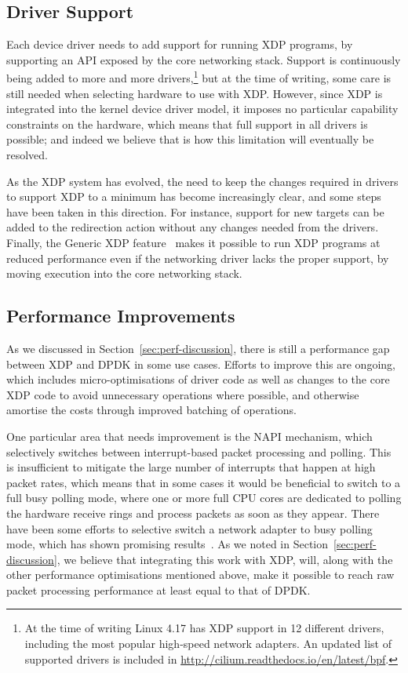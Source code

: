 \documentclass[10pt,sigconf,anonymous]{acmart}
\begin{document}
\subsection{Driver Support}
\label{sec:driver-support}
Each device driver needs to add support for running XDP programs, by supporting
an API exposed by the core networking stack. Support is continuously being added
to more and more drivers,\footnote{At the time of writing Linux 4.17 has XDP
  support in 12 different drivers, including the most popular high-speed network
  adapters. An updated list of supported drivers is included in
  \url{http://cilium.readthedocs.io/en/latest/bpf}.} but at the time of writing,
some care is still needed when selecting hardware to use with XDP. However,
since XDP is integrated into the kernel device driver model, it imposes no
particular capability constraints on the hardware, which means that full support
in all drivers is possible; and indeed we believe that is how this limitation
will eventually be resolved.

As the XDP system has evolved, the need to keep the changes required in drivers
to support XDP to a minimum has become increasingly clear, and some steps have
been taken in this direction. For instance, support for new targets can be added
to the redirection action without any changes needed from the drivers. Finally,
the Generic XDP feature~\cite{generic-xdp} makes it possible to run XDP
programs at reduced performance even if the networking driver lacks the proper
support, by moving execution into the core networking stack.

\subsection{Performance Improvements}
\label{sec:improvements-napi}
As we discussed in Section~\ref{sec:perf-discussion}, there is still a
performance gap between XDP and DPDK in some use cases. Efforts to improve this
are ongoing, which includes micro-optimisations of driver code as well as
changes to the core XDP code to avoid unnecessary operations where possible, and
otherwise amortise the costs through improved batching of operations.

One particular area that needs improvement is the NAPI mechanism, which
selectively switches between interrupt-based packet processing and polling. This
is insufficient to mitigate the large number of interrupts that happen at high
packet rates, which means that in some cases it would be beneficial to switch to
a full busy polling mode, where one or more full CPU cores are dedicated to
polling the hardware receive rings and process packets as soon as they appear.
There have been some efforts to selective switch a network adapter to busy
polling mode, which has shown promising results~\cite{dumazet17:_busyp}. As we
noted in Section~\ref{sec:perf-discussion}, we believe that integrating this
work with XDP, will, along with the other performance optimisations mentioned
above, make it possible to reach raw packet processing performance at least
equal to that of DPDK.
\end{document}
